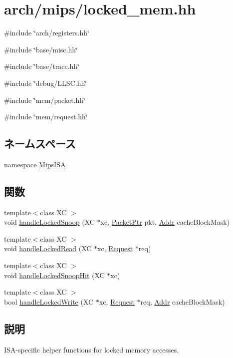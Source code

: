 \hypertarget{mips_2locked__mem_8hh}{
\section{arch/mips/locked\_\-mem.hh}
\label{mips_2locked__mem_8hh}
}
{\ttfamily \#include \char`\"{}arch/registers.hh\char`\"{}}\par
{\ttfamily \#include \char`\"{}base/misc.hh\char`\"{}}\par
{\ttfamily \#include \char`\"{}base/trace.hh\char`\"{}}\par
{\ttfamily \#include \char`\"{}debug/LLSC.hh\char`\"{}}\par
{\ttfamily \#include \char`\"{}mem/packet.hh\char`\"{}}\par
{\ttfamily \#include \char`\"{}mem/request.hh\char`\"{}}\par
\subsection*{ネームスペース}
\begin{DoxyCompactItemize}
\item 
namespace \hyperlink{namespaceMipsISA}{MipsISA}
\end{DoxyCompactItemize}
\subsection*{関数}
\begin{DoxyCompactItemize}
\item 
{\footnotesize template$<$class XC $>$ }\\void \hyperlink{namespaceMipsISA_a5f9bf68eab13cc8599dadd035bb3a45e}{handleLockedSnoop} (XC $\ast$xc, \hyperlink{classPacket}{PacketPtr} pkt, \hyperlink{base_2types_8hh_af1bb03d6a4ee096394a6749f0a169232}{Addr} cacheBlockMask)
\item 
{\footnotesize template$<$class XC $>$ }\\void \hyperlink{namespaceMipsISA_aa7cc172c439c44fb54dc4c9ba7d90c3d}{handleLockedRead} (XC $\ast$xc, \hyperlink{classRequest}{Request} $\ast$req)
\item 
{\footnotesize template$<$class XC $>$ }\\void \hyperlink{namespaceMipsISA_a6212c59e93e2406923f9f1f3c6aabc9f}{handleLockedSnoopHit} (XC $\ast$xc)
\item 
{\footnotesize template$<$class XC $>$ }\\bool \hyperlink{namespaceMipsISA_afc30934f8d6d2afd2ff8f255ab6653ba}{handleLockedWrite} (XC $\ast$xc, \hyperlink{classRequest}{Request} $\ast$req, \hyperlink{base_2types_8hh_af1bb03d6a4ee096394a6749f0a169232}{Addr} cacheBlockMask)
\end{DoxyCompactItemize}


\subsection{説明}
ISA-\/specific helper functions for locked memory accesses. 